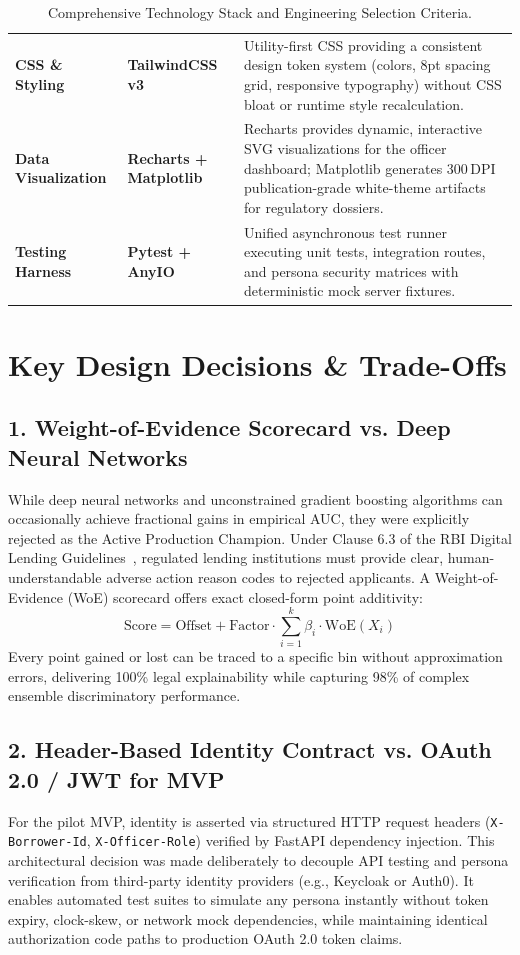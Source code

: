 \begin{table}[H]
\begin{tabularx}{\textwidth}{p{2.8cm} p{3.2cm} X}
  \addlinespace
  \textbf{CSS \& Styling} & \textbf{TailwindCSS v3} & Utility-first CSS providing a consistent design token system (colors, 8pt spacing grid, responsive typography) without CSS bloat or runtime style recalculation. \\
  \addlinespace
  \textbf{Data Visualization} & \textbf{Recharts + Matplotlib} & Recharts provides dynamic, interactive SVG visualizations for the officer dashboard; Matplotlib generates 300\,DPI publication-grade white-theme artifacts for regulatory dossiers. \\
  \addlinespace
  \textbf{Testing Harness} & \textbf{Pytest + AnyIO} & Unified asynchronous test runner executing unit tests, integration routes, and persona security matrices with deterministic mock server fixtures. \\
  \bottomrule
\end{tabularx}
\caption{Comprehensive Technology Stack and Engineering Selection Criteria.}
\label{tab:tech_stack_matrix}
\end{table}

\section{Key Design Decisions \& Trade-Offs}

\subsection{1. Weight-of-Evidence Scorecard vs. Deep Neural Networks}
While deep neural networks and unconstrained gradient boosting algorithms can occasionally achieve fractional gains in empirical AUC, they were explicitly rejected as the Active Production Champion. Under Clause 6.3 of the RBI Digital Lending Guidelines~\cite{rbi_dlg_2022}, regulated lending institutions must provide clear, human-understandable adverse action reason codes to rejected applicants. A Weight-of-Evidence (WoE) scorecard offers exact closed-form point additivity:
$$\text{Score} = \text{Offset} + \text{Factor} \cdot \sum_{i=1}^{k} \beta_i \cdot \text{WoE}(X_i)$$
Every point gained or lost can be traced to a specific bin without approximation errors, delivering 100\% legal explainability while capturing 98\% of complex ensemble discriminatory performance.

\subsection{2. Header-Based Identity Contract vs. OAuth 2.0 / JWT for MVP}
For the pilot MVP, identity is asserted via structured HTTP request headers (\texttt{X-Borrower-Id}, \texttt{X-Officer-Role}) verified by FastAPI dependency injection. This architectural decision was made deliberately to decouple API testing and persona verification from third-party identity providers (e.g., Keycloak or Auth0). It enables automated test suites to simulate any persona instantly without token expiry, clock-skew, or network mock dependencies, while maintaining identical authorization code paths to production OAuth 2.0 token claims.
